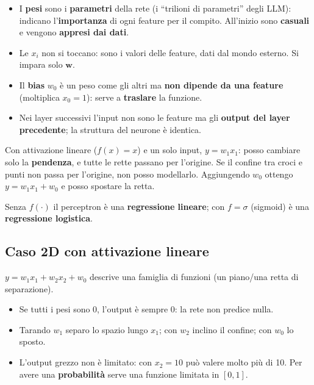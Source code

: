 \begin{itemize}
  \item I \textbf{pesi} sono i \textbf{parametri} della rete (i ``trilioni di parametri'' degli LLM): indicano
        l'\textbf{importanza} di ogni feature per il compito. All'inizio sono \textbf{casuali} e vengono
        \textbf{appresi dai dati}.
  \item Le $x_i$ non si toccano: sono i valori delle feature, dati dal mondo esterno. Si impara solo $\mathbf{w}$.
  \item Il \textbf{bias} $w_0$ è un peso come gli altri ma \textbf{non dipende da una feature} (moltiplica $x_0=1$):
        serve a \textbf{traslare} la funzione.
  \item Nei layer successivi l'input non sono le feature ma gli \textbf{output del layer precedente}; la struttura del neurone
        è identica.
\end{itemize}

\begin{esempio}
Con attivazione lineare ($f(x)=x$) e un solo input, $y = w_1 x_1$: posso cambiare solo la \textbf{pendenza}, e tutte le
rette passano per l'origine. Se il confine tra croci e punti non passa per l'origine, non posso modellarlo. Aggiungendo
$w_0$ ottengo $y = w_1x_1 + w_0$ e posso spostare la retta.
\end{esempio}

\begin{integrazione}
Senza $f(\cdot)$ il perceptron è una \textbf{regressione lineare}; con $f = \sigma$ (sigmoid) è una
\textbf{regressione logistica}.
\end{integrazione}

\subsection{Caso 2D con attivazione lineare}
$y = w_1x_1 + w_2x_2 + w_0$ descrive una famiglia di funzioni (un piano/una retta di separazione).
\begin{itemize}
  \item Se tutti i pesi sono 0, l'output è sempre 0: la rete non predice nulla.
  \item Tarando $w_1$ separo lo spazio lungo $x_1$; con $w_2$ inclino il confine; con $w_0$ lo sposto.
  \item L'output grezzo non è limitato: con $x_2=10$ può valere molto più di 10. Per avere una
        \textbf{probabilità} serve una funzione limitata in $[0,1]$.
\end{itemize}

